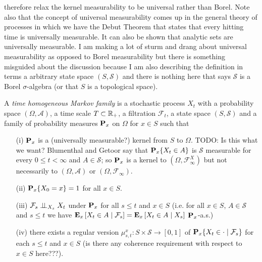 therefore relax the kernel measurability to be universal rather than Borel.  Note also that the 
concept of universal measurability comes up in the general theory of processes in which
we have the Debut Theorem that states that every hitting time is universally measurable.  It can also be shown that
analytic sets are universally measurable.  I am making a lot of sturm and drang about universal measurability as opposed
to Borel measurability but there is something misguided about the discussion because I am also describing the
definition in terms a arbitrary state space $(S, \mathcal{S})$ and there is nothing here that says $\mathcal{S}$ is a Borel
$\sigma$-algebra (or that $S$ is a topological space).  

\begin{defn}\label{MarkovFamilyDefn}
A \emph{time homogeneous Markov family} is a stochastic process $X_t$ with a
probability space $(\Omega, \mathcal{A})$, a time scale $T
\subset \reals_+$, a filtration $\mathcal{F}_t$, a state space $(S, \mathcal{S})$ and a family of
probability measures $\probabilityop_x$ on $\Omega$ for $x \in S$ such that 
\begin{itemize}
\item[(i)]$\probabilityop_x$ is a (universally measurable?) kernel
  from $S$ to $\Omega$.  TODO: Is this what we want?  Blumenthal and Getoor say that $\sprobability{X_t \in A}{x}$ is $\mathcal{S}$ measurable for every
$0 \leq t < \infty$ and $A \in \mathcal{S}$; so $\probabilityop_x$ is a kernel to $(\Omega, \mathcal{F}^X_\infty)$ but not necessarily to $(\Omega, \mathcal{A})$ or 
$(\Omega, \mathcal{F}_\infty)$.
\item[(ii)]$\sprobability{X_0 = x}{x} = 1$ for all $x \in S$.
\item[(iii)]$\cindependent{\mathcal{F}_s}{X_t}{X_s}$ under
  $\probabilityop_x$ for all $s \leq
  t$ and $x \in S$ (i.e. for all $x \in S$, $A \in \mathcal{S}$ and $s \leq t$ we have
  $\csexpectationlong{\mathcal{F}_s}{X_t \in A}{x} =
  \csexpectationlong{X_s}{X_t \in A}{x}$ $\probabilityop_x$-a.s.)
\item[(iv)]there exists a regular version $\mu^x_{s,t} :
  S \times \mathcal{S} \to [0,1]$ of $\csprobability{\mathcal{F}_s}{X_t
    \in \cdot}{x}$ for each $s \leq t$ and $x \in S$ (is there any coherence
  requirement with respect to $x \in S$ here???).
\end{itemize}
\end{defn}

